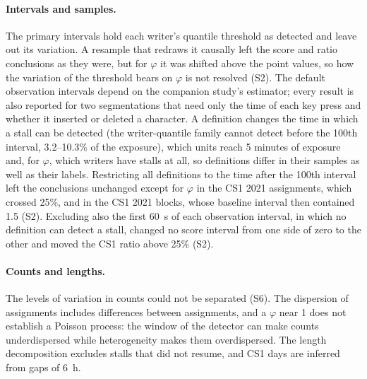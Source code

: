 \paragraph{Intervals and samples.} The primary intervals hold each writer's quantile threshold as detected and leave
out its variation. A resample that redraws it causally left the score and ratio conclusions as they were, but for
$\varphi$ it was shifted above the point values, so how the variation of the threshold bears on $\varphi$ is not
resolved (S2). The default observation intervals depend on the companion study's estimator; every result is also
reported for two segmentations that need only the time of each key press and whether it inserted or deleted a
character.
A definition changes the time in which a stall can be detected (the writer-quantile family
cannot detect before the 100th interval, 3.2--10.3\% of the exposure), which units reach 5 minutes of exposure and, for $\varphi$, which writers
have stalls at all, so definitions differ in their samples as well as their labels. Restricting all definitions to the time after the 100th interval
left the conclusions unchanged except for $\varphi$ in the CS1 2021 assignments, which crossed 25\%, and in the CS1 2021
blocks, whose baseline interval then contained 1.5 (S2). Excluding also the first 60~s of each observation interval,
in which no definition can detect a stall, changed no score interval from one side of zero to the other and moved the
CS1 ratio above 25\% (S2).

\paragraph{Counts and lengths.} The levels of variation in counts could not be separated (S6). The dispersion of
assignments includes differences between assignments, and a $\varphi$ near 1 does not establish a Poisson process: the
window of the detector can make counts underdispersed while heterogeneity makes them overdispersed. The length
decomposition excludes stalls that did not resume, and CS1 days are inferred from gaps of 6~h.

